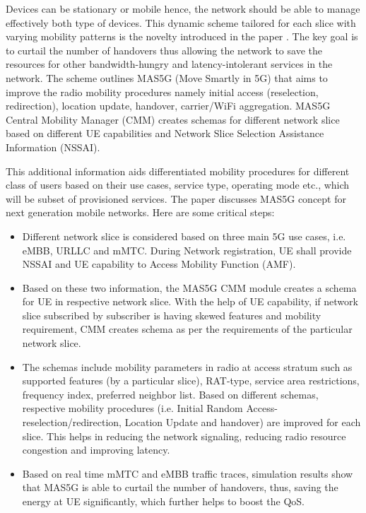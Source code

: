 \begin{multicols}{2}
Devices can be stationary or mobile hence, the network should be able to manage effectively both type of devices. This dynamic scheme tailored for each slice with varying mobility patterns is the novelty introduced in the paper \cite{art1-key01}. The key goal is to curtail the number of handovers thus allowing the network to save the resources for other bandwidth-hungry and latency-intolerant services in the network. The scheme outlines MAS5G (Move Smartly in 5G) that aims to improve the radio mobility procedures  namely initial access (reselection, redirection), location update, handover, carrier/WiFi aggregation. MAS5G Central Mobility Manager (CMM) creates schemas for different network slice based on different UE capabilities and Network Slice Selection Assistance Information (NSSAI). 

This additional information aids differentiated mobility procedures for different class of users based on their use cases, service type, operating mode etc., which will be subset of provisioned services. The paper discusses MAS5G concept for next generation mobile networks. Here are some critical steps:
\begin{itemize}
\itemsep=2pt
\item Different network slice is considered based on three main 5G use cases, i.e. eMBB, URLLC and mMTC. During Network registration, UE shall provide NSSAI and UE capability to Access Mobility Function  (AMF).

\item Based on these two information, the MAS5G CMM  module creates a schema for UE in respective network  slice. With the help of UE capability, if network slice subscribed by subscriber is having skewed features and mobility requirement, CMM creates schema as per the requirements of the particular network slice. 

\item The schemas include mobility parameters in radio at access stratum such as supported features (by a particular slice), RAT-type, service area restrictions, frequency index, preferred neighbor list. Based on different schemas, respective mobility procedures (i.e. Initial Random Access-reselection/redirection, Location Update and handover) are improved for each slice. This helps in reducing the network signaling, reducing radio resource congestion and improving latency. 

\item Based on real time mMTC and eMBB traffic traces, simulation results show that MAS5G is able to curtail the number of handovers, thus, saving the energy at UE significantly, which further helps to boost the QoS.


\end{itemize}
\end{multicols}
